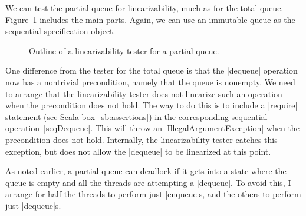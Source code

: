 
We can test the partial queue for linearizability, much as for the total
queue.  Figure~\ref{fig:partial-queue-lin-tester} includes the main parts.
Again, we can use an immutable queue as the sequential specification object.


\begin{figure}
\caption{Outline of a linearizability tester for a partial queue.}
\label{fig:partial-queue-lin-tester}
\end{figure}


One difference from the tester for the total queue is that the |dequeue|
operation now has a nontrivial precondition, namely that the queue is nonempty.
We need to arrange that the linearizability tester does not linearize such an
operation when the precondition does not hold.  The way to do this is to
include a |require| statement (see Scala box~\ref{sb:assertions}) in the
corresponding sequential operation~|seqDequeue|.  This will throw an
|IllegalArgumentException| when the precondition does not hold.  Internally,
the linearizability tester catches this exception, but does not allow the
|dequeue| to be linearized at this point.

As noted earlier, a partial queue can deadlock if it gets into a state where
the queue is empty and all the threads are attempting a |dequeue|.  To avoid
this, I arrange for half the threads to perform just |enqueue|s, and the others
to perform just |dequeue|s.


